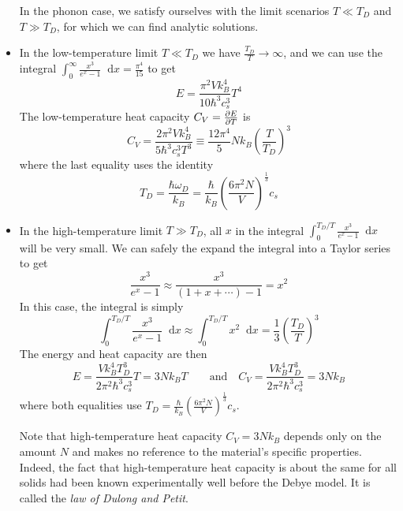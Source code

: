\documentclass[11pt, a4paper]{article}
\newcommand{\diff}{\mathop{}\!\mathrm{d}} %
\begin{document}
\begin{itemize}
	In the phonon case, we satisfy ourselves with the limit scenarios $ T\ll T_{D} $ and $ T \gg T_{D} $, for which we can find analytic solutions.
	
	\item In the low-temperature limit $ T \ll T_{D} $ we have $ \frac{T_{D}}{T} \to \infty $, and we can use the integral $ \int_{0}^{\infty}\frac{x^{3}}{e^{x}-1}\diff x = \frac{\pi^{4}}{15}$ to get
	\begin{equation*}
		E = \frac{\pi^{2}Vk_{B}^{4}}{10 \hbar^{3} c_{s}^{3}}T^{4}
	\end{equation*}
	The low-temperature heat capacity $ C_{V} = \pdv{E}{T} $  is
	\begin{equation*}
		C_{V} = \frac{2\pi^{2}Vk_{B}^{4}}{5\hbar^{3} c_{s}^{3}T^{3}} \equiv \frac{12\pi^{4}}{5}Nk_{B}\left(\frac{T}{T_{D}}\right)^{3}
	\end{equation*}
	where the last equality uses the identity
	\begin{equation*}
		T_{D} = \frac{\hbar \omega_{D}}{k_{B}} = \frac{\hbar}{k_{B}} \left(\frac{6\pi^{2}N}{V}\right)^{\frac{1}{3}}c_{s}
	\end{equation*}
	
	\item In the high-temperature limit $ T \gg T_{D} $, all $ x $ in the integral $  \int_{0}^{T_{D}/T}\frac{x^{3}}{e^{x}-1}\diff x  $ will be very small. We can safely the expand the integral into a Taylor series to get
	\begin{equation*}
		\frac{x^{3}}{e^{x} - 1} \approx \frac{x^{3}}{(1 + x + \cdots )-1} = x^{2}
	\end{equation*}
	In this case, the integral is simply
	\begin{equation*}
		 \int_{0}^{T_{D}/T}\frac{x^{3}}{e^{x}-1}\diff x  \approx \int_{0}^{T_{D}/T} x^{2}\diff x  = \frac{1}{3}\left(\frac{T_{D}}{T}\right)^{3}
	\end{equation*}
	The energy and heat capacity are then 
	\begin{equation*}
		E = \frac{Vk_{B}^{4}T_{D}^{3}}{2\pi^{2}\hbar^{3}c_{s}^{3}}T = 3Nk_{B}T \qquad \text{and}\quad C_{V} = \frac{V k_{B}^{4}T_{D}^{3}}{2\pi^{2}\hbar^{3}c_{s}^{3}} = 3 N k_{B}
	\end{equation*}
	where both equalities use $ T_{D} = \frac{\hbar}{k_{B}} \left(\frac{6\pi^{2}N}{V}\right)^{\frac{1}{3}}c_{s} $.
	
	Note that high-temperature heat capacity $ C_{V} = 3Nk_{B} $ depends only on the amount $ N $ and makes no reference to the material's specific properties. Indeed, the fact that high-temperature heat capacity is about the same for all solids had been known experimentally well before the Debye model. It is called the \textit{law of Dulong and Petit}. 
	
\end{itemize}
\end{document}
